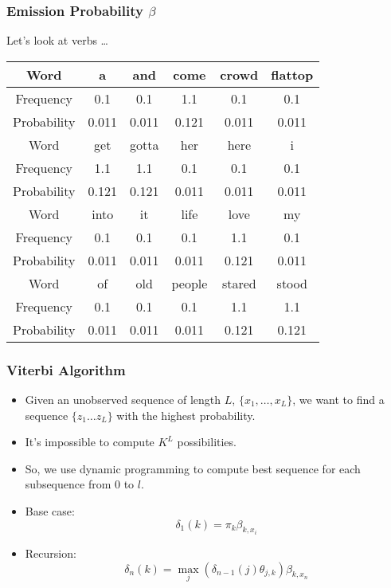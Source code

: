 \documentclass{beamer}
\begin{document}
\begin{frame}

\frametitle{Emission Probability $\beta$}

Let's look at verbs \dots

\begin{tabular}{c|ccccc}
\hline
Word & a & and & come & crowd & flattop \\
\hline
Frequency & 0.1 & 0.1 & 1.1 & 0.1 & 0.1 \\
\hline
Probability & 0.011 &  0.011 & 0.121 & 0.011 &  0.011 \\
\hline
\hline
Word & get & gotta & her & here & i \\
\hline
Frequency & 1.1 & 1.1 & 0.1 & 0.1 & 0.1 \\
\hline
Probability & 0.121 & 0.121 & 0.011 &  0.011 & 0.011 \\
\hline
\hline
Word & into & it & life & love & my \\
\hline
Frequency & 0.1 & 0.1 & 0.1 & 1.1 & 0.1 \\
\hline
Probability & 0.011 & 0.011 & 0.011 & 0.121 & 0.011 \\
\hline
\hline
Word & of & old & people & stared & stood \\
\hline
Frequency & 0.1 & 0.1 & 0.1 & 1.1 & 1.1 \\
\hline
Probability & 0.011 & 0.011 & 0.011 & 0.121 & 0.121 \\
\hline
\end{tabular}

\end{frame}

\begin{frame}
\frametitle{Viterbi Algorithm}

\begin{itemize}
\item Given an unobserved sequence of length $L$, $\{x_1, \dots, x_L\}$, we want to find a sequence $\{z_1 \dots z_L\}$ with the highest probability.
\pause
\item It's impossible to compute $K^L$ possibilities.
\item So, we use dynamic programming to compute best sequence for each subsequence from $0$ to $l$.
\item Base case:
\begin{equation}
\delta_1(k) = \pi_k \beta_{k, x_i}
\end{equation}
\item Recursion:
\begin{equation}
\delta_n(k) = \max_{j} {\left(\delta_{n-1}(j)\theta_{j,k}\right)} \beta_{k, x_n}\end{equation}
\end{itemize}

\end{frame}
\end{document}
